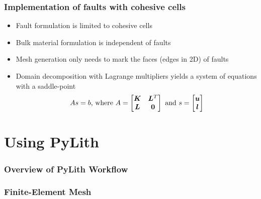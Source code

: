 \documentclass[aspectratio=169]{beamer}
\begin{document}
\begin{frame}
  \frametitle{Implementation of faults with cohesive cells}
  \summary{}

  \begin{itemize}
    \begin{itemize}
    \item Fault formulation is limited to cohesive cells
    \item Bulk material formulation is independent of faults
    \item Mesh generation only needs to mark the faces (edges in 2D) of faults
    \end{itemize}
    \begin{itemize}
    \item Domain decomposition with Lagrange multipliers yields a system of equations with a saddle-point
      \begin{equation}
        A s = b \text{, where }
        A =
        \begin{bmatrix}
          \bm{K} & \bm{L}^{T} \\
          \bm{L} & \bm{0}
        \end{bmatrix}
        \text{ and }
        s = 
        \begin{bmatrix}
          \bm{u} \\
          \bm{l}
        \end{bmatrix}
      \end{equation}
    \end{itemize}
  \end{itemize}
  
\end{frame}


\section{Using PyLith}

\begin{frame}
  \frametitle{Overview of PyLith Workflow}
  \summary{}

\end{frame}


\begin{frame}
  \frametitle{Finite-Element Mesh}
  \summary{}

  \begin{minipage}{0.40\textwidth}
  \end{minipage}
  \hfill
  \begin{minipage}{0.58\textwidth}
  \end{minipage}
  
\end{frame}
\end{document}
